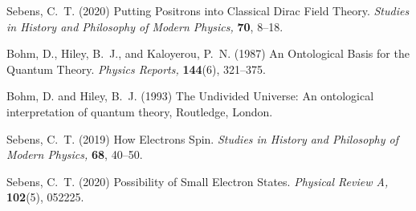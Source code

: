 \documentclass[onecolumn,secnumarabic,amsmath,amssymb,balancelastpage,nofootinbib]{article}
\begin{document}
\begin{thebibliography}{100}
Sebens, C.~T. (2020)
Putting Positrons into Classical Dirac Field Theory.
{\em Studies in History and Philosophy of Modern Physics,} {\bf 70}, 8--18.

Bohm, D., Hiley, B.~J., and Kaloyerou, P.~N. (1987)
An Ontological Basis for the Quantum Theory.
{\em Physics Reports,} {\bf 144}(6), 321--375.

Bohm, D. and Hiley, B.~J. (1993)
The Undivided Universe: An ontological interpretation of quantum theory,
Routledge, London.

Sebens, C.~T. (2019)
How Electrons Spin.
{\em Studies in History and Philosophy of Modern Physics,} {\bf 68}, 40--50.

Sebens, C.~T. (2020)
Possibility of Small Electron States.
{\em Physical Review A,} {\bf 102}(5), 052225.

\end{thebibliography}
\end{document}
